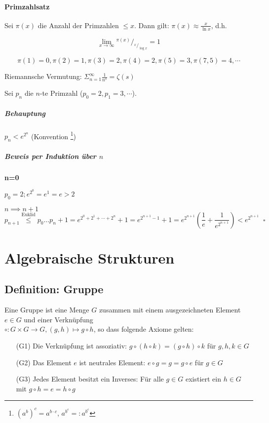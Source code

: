 \documentclass[14pt,a4paper]{article}
\newcommand*\rfrac[2]{{}^{#1}\!/_{#2}}
\begin{document}
    \paragraph{Primzahlsatz}
    Sei $\pi(x)$ die Anzahl der Primzahlen $ \le x$.
    Dann gilt: $\pi(x) \approx \frac{x}{\ln x}$, d.h.

    $$ \lim_{x \to \infty} \rfrac{\pi(x)}{\rfrac{x}{\log x}} = 1$$

    $$ \pi(1) = 0, \pi(2) = 1, \pi(3)=2, \pi(4) = 2, \pi(5)=3, \pi(7,5)=4,
    \dotsb $$

    Riemannsche Vermutung: $ \Sigma_{n=1}^{\infty} \frac{1}{n^s} = \zeta(s) $

    Sei $p_n$ die $n$-te Primzahl ($p_0 = 2, p_1=3, \dotsb $).
    \subparagraph{Behauptung}
    $ p_n < e^{2^n} $ (Konvention \footnote{$ (a^b)^c = a^{b \cdot c} $, $ a^{b^c}
      =: a^{b^c}$})

    \subparagraph{Beweis per Induktion über $n$}\par
    \textbf{n=0}\par
    $p_0 = 2; e^{2^0} = e^1 = e > 2$\par
    \textbf{$n \implies n+1$}
    $$p_{n+1} \stackrel{\text{Euklid}}{\leq} p_0 \dots p_n + 1 = e^{2^0 + 2^1 +
      \dotsb + 2^n} + 1 = e^{2^{n+1}-1}+1 = e^{2^{n+1}}(\frac{1}{e} +
    \frac{1}{e^{2^{n+1}}}) < e^{2^{n+1}} \;\; \square$$

    \section{Algebraische Strukturen}
    \subsection{Definition: Gruppe}
    Eine Gruppe ist eine Menge $G$ zusammen mit einem ausgezeichneten Element $e
    \in G$ und einer Verknüpfung \\ $ \circ : G \times G \to G, (g,h) \mapsto g \circ
    h$, so dass folgende Axiome gelten:

    \begin{enumerate}
      \item[(G1)] Die Verknüpfung ist assoziativ: $ g \circ ( h \circ k ) = (g \circ
   	 h) \circ k$ für $g,h,k \in G$
      \item[(G2)] Das Element $e$ ist neutrales Element: $ e \circ g = g = g \circ
   	 e$ für $g \in G$
      \item[(G3)] Jedes Element besitzt ein Inverses: Für alle $ g\in G$ existiert
   	 ein $h \in G$ mit $g \circ h = e = h \circ g$
    \end{enumerate}
\end{document}

